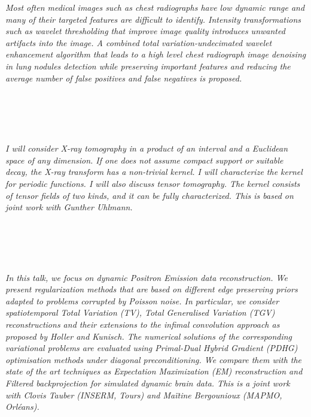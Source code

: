   \begin{multicols}{2}
      \textit{Most often medical images such as chest radiographs have low dynamic range and many of their targeted features are difficult to identify. Intensity transformations such as wavelet thresholding that improve image quality introduces unwanted artifacts into the image. A combined total variation-undecimated wavelet enhancement algorithm that leads to a high level chest radiograph image denoising in lung nodules detection while preserving important features and reducing the average number of false positives and false negatives is proposed.}\\
\\ 
        \\
        \\\\
\\
      \textit{I will consider X-ray tomography in a product of an interval and a Euclidean space of any dimension. If one does not assume compact support or suitable decay, the X-ray transform has a non-trivial kernel. I will characterize the kernel for periodic functions. I will also discuss tensor tomography. The kernel consists of tensor fields of two kinds, and it can be fully characterized. This is based on joint work with Gunther Uhlmann.}\\
\\ 
        \\
        \\\\
\\
      \textit{In this talk, we focus on dynamic Positron Emission data reconstruction.  We present regularization methods that are based on different edge preserving priors adapted to problems corrupted by Poisson noise. In particular, we consider spatiotemporal Total Variation (TV), Total Generalised Variation (TGV) reconstructions and their extensions to the infimal convolution approach as proposed by Holler and Kunisch. The numerical solutions of the corresponding variational problems are evaluated using Primal-Dual Hybrid Gradient (PDHG) optimisation methods under diagonal preconditioning. We compare them with the state of the art techniques as Expectation Maximization (EM) reconstruction and Filtered backprojection for simulated dynamic brain data. This is a joint work with Clovis Tauber (INSERM, Tours) and Maïtine Bergounioux (MAPMO, Orléans).}\\

\end{multicols}
